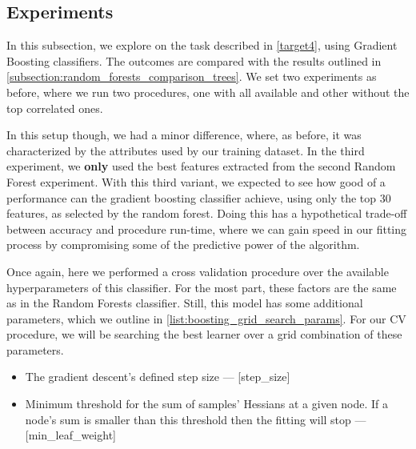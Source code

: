 %
%
%
%


\subsection{Experiments}\label{subsection:boosting_experiments}


In this subsection, we explore on the task described in \cref{target4}, using Gradient Boosting classifiers.
The outcomes are compared with the results outlined in \cref{subsection:random_forests_comparison_trees}.
We set two experiments as before, where we run two procedures, one with all available and other without the top correlated ones.

In this setup though, we had a minor difference, where, as before, it was characterized by the attributes used by our training dataset.
In the third experiment, we \textbf{only} used the best features extracted from the second Random Forest experiment.
With this third variant, we expected to see how good of a performance can the gradient boosting classifier achieve, using only the top 30 features, as selected by the random forest.
Doing this has a hypothetical trade-off between accuracy and procedure run-time, where we can gain speed in our fitting process by compromising some of the predictive power of the algorithm.

Once again, here we performed a cross validation procedure over the available hyperparameters of this classifier.
For the most part, these factors are the same as in the Random Forests classifier.
Still, this model has some additional parameters, which we outline in \cref{list:boosting_grid_search_params}.
For our CV procedure, we will be searching the best learner over a grid combination of these parameters.

\begin{itemize}

  \item The gradient descent's defined step size  --- [step\_size]
  \item Minimum threshold for the sum of samples' Hessians at a given node. 
  If a node's sum is smaller than this threshold then the fitting will stop  --- [min\_leaf\_weight]
\label{list:boosting_grid_search_params}
\end{itemize}


